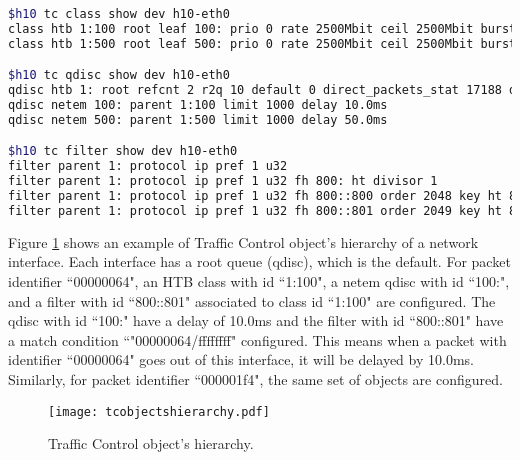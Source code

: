 \begin{lstlisting}[caption={Traffic Conroller object's configuration example},label={lst:tcoce},language=bash,tabsize=2,basicstyle=\footnotesize,breaklines=true,showspaces=false,showstringspaces=false,showtabs=false,frame=single]
$h10 tc class show dev h10-eth0
class htb 1:100 root leaf 100: prio 0 rate 2500Mbit ceil 2500Mbit burst 1250b cburst 1250b
class htb 1:500 root leaf 500: prio 0 rate 2500Mbit ceil 2500Mbit burst 1250b cburst 1250b

$h10 tc qdisc show dev h10-eth0
qdisc htb 1: root refcnt 2 r2q 10 default 0 direct_packets_stat 17188 direct_qlen 1000
qdisc netem 100: parent 1:100 limit 1000 delay 10.0ms
qdisc netem 500: parent 1:500 limit 1000 delay 50.0ms

$h10 tc filter show dev h10-eth0
filter parent 1: protocol ip pref 1 u32
filter parent 1: protocol ip pref 1 u32 fh 800: ht divisor 1
filter parent 1: protocol ip pref 1 u32 fh 800::800 order 2048 key ht 800 bkt 0 flowid 1:100 match 00000064/ffffffff at 28
filter parent 1: protocol ip pref 1 u32 fh 800::801 order 2049 key ht 800 bkt 0 flowid 1:500 match 000001f4/ffffffff at 28
\end{lstlisting}

Figure \ref{fig:tcobjhier} shows an example of Traffic Control object's hierarchy of a network interface. Each interface has a root queue (qdisc), which is the default. For packet identifier ``00000064", an HTB class with id ``1:100", a netem qdisc with id ``100:", and a filter with id ``800::801" associated to class id ``1:100" are configured. The qdisc with id ``100:" have a delay of 10.0ms and the filter with id ``800::801" have a match condition ``"00000064/ffffffff" configured. This means when a packet with identifier ``00000064" goes out of this interface, it will be delayed by 10.0ms. Similarly, for packet identifier ``000001f4", the same set of objects are configured.

\begin{figure}[H]
	\begin{center}
		\resizebox{\textwidth}{!}
		{\texttt{[image: tcobjectshierarchy.pdf]}}
		\caption{Traffic Control object's hierarchy.}
		\label{fig:tcobjhier}
	\end{center}
\end{figure}

